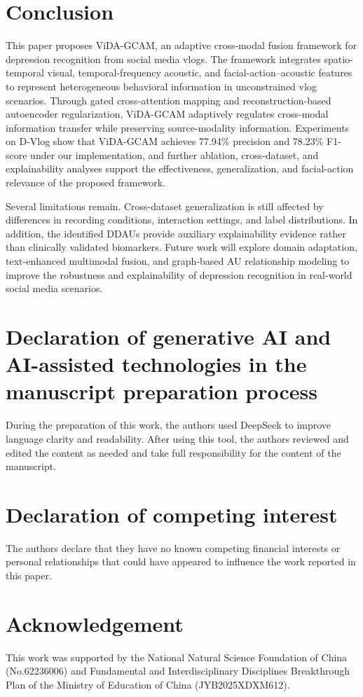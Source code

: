 \documentclass[a4paper,fleqn]{cas-dc}
\begin{document}
\section{Conclusion}
This paper proposes ViDA-GCAM, an adaptive cross-modal fusion framework for depression recognition from social media vlogs. The framework integrates spatio-temporal visual, temporal-frequency acoustic, and facial-action–acoustic features to represent heterogeneous behavioral information in unconstrained vlog scenarios. Through gated cross-attention mapping and reconstruction-based autoencoder regularization, ViDA-GCAM adaptively regulates cross-modal information transfer while preserving source-modality information. Experiments on D-Vlog show that ViDA-GCAM achieves 77.94\% precision and 78.23\% F1-score under our implementation, and further ablation, cross-dataset, and explainability analyses support the effectiveness, generalization, and facial-action relevance of the proposed framework.

Several limitations remain. Cross-dataset generalization is still affected by differences in recording conditions, interaction settings, and label distributions. In addition, the identified DDAUs provide auxiliary explainability evidence rather than clinically validated biomarkers. Future work will explore domain adaptation, text-enhanced multimodal fusion, and graph-based AU relationship modeling to improve the robustness and explainability of depression recognition in real-world social media scenarios.

\printcredits

\section*{Declaration of generative AI and AI-assisted technologies in the manuscript preparation process}
During the preparation of this work, the authors used DeepSeek to improve language clarity and readability. After using this tool, the authors reviewed and edited the content as needed and take full responsibility for the content of the manuscript.

\section*{Declaration of competing interest}
The authors declare that they have no known competing financial interests or personal relationships that could have appeared to influence the work reported in this paper.

\section*{Acknowledgement}
This work was supported by the National Natural Science Foundation of China (No.62236006) and Fundamental and Interdisciplinary Disciplines Breakthrough Plan of the Ministry of Education of China (JYB2025XDXM612).

% 



\end{document}
